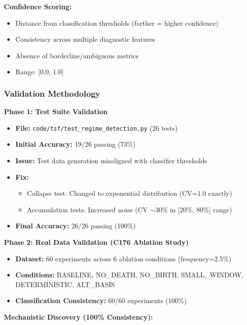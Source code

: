 \documentclass[11pt]{article}
\begin{document}
\textbf{Confidence Scoring:}
\begin{itemize}
\item Distance from classification thresholds (farther = higher confidence)
\item Consistency across multiple diagnostic features
\item Absence of borderline/ambiguous metrics
\item Range: [0.0, 1.0]
\end{itemize}

\subsubsection{Validation Methodology}

\textbf{Phase 1: Test Suite Validation}
\begin{itemize}
\item \textbf{File:} \texttt{code/tsf/test\_regime\_detection.py} (26 tests)
\item \textbf{Initial Accuracy:} 19/26 passing (73\%)
\item \textbf{Issue:} Test data generation misaligned with classifier thresholds
\item \textbf{Fix:}
\begin{itemize}
  \item Collapse test: Changed to exponential distribution (CV=1.0 exactly)
  \item Accumulation tests: Increased noise (CV $\sim$30\% in [20\%, 80\%] range)
\end{itemize}
\item \textbf{Final Accuracy:} 26/26 passing (100\%)
\end{itemize}

\textbf{Phase 2: Real Data Validation (C176 Ablation Study)}
\begin{itemize}
\item \textbf{Dataset:} 60 experiments across 6 ablation conditions (frequency=2.5\%)
\item \textbf{Conditions:} BASELINE, NO\_DEATH, NO\_BIRTH, SMALL\_WINDOW, DETERMINISTIC, ALT\_BASIS
\item \textbf{Classification Consistency:} 60/60 experiments (100\%)
\end{itemize}

\textbf{Mechanistic Discovery (100\% Consistency):}
\end{document}
